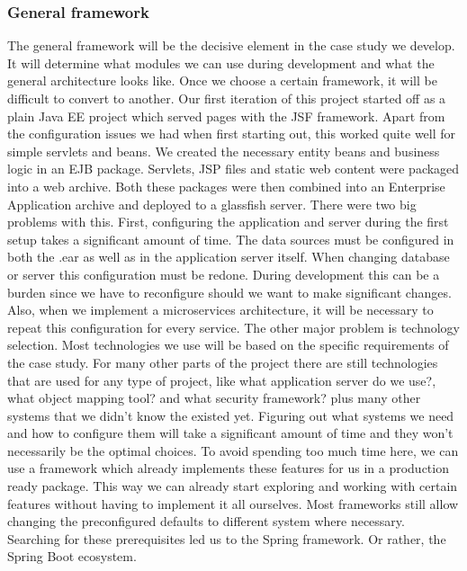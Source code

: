 \documentclass[12pt]{article}
\begin{document}
\subsubsection{General framework}
The general framework will be the decisive element in the case study we develop. It will determine what modules we can use during development and what the general architecture looks like. Once we choose a certain framework, it will be difficult to convert to another. Our first iteration of this project started off as a plain Java EE project which served pages with the JSF framework. Apart from the configuration issues we had when first starting out, this worked quite well for simple servlets and beans. We created the necessary entity beans and business logic in an EJB package. Servlets, JSP files and static web content were packaged into a web archive. Both these packages were then combined into an Enterprise Application archive and deployed to a glassfish server. There were two big problems with this. First, configuring the application and server during the first setup takes a significant amount of time. The data sources must be configured in both the .ear as well as in the application server itself. When changing database or server this configuration must be redone. During development this can be a burden since we have to reconfigure should we want to make significant changes. Also, when we implement a microservices architecture, it will be necessary to repeat this configuration for every service. The other major problem is technology selection. Most technologies we use will be based on the specific requirements of the case study. For many other parts of the project there are still technologies that are used for any type of project, like what application server do we use?, what object mapping tool? and what security framework? plus many other systems that we didn't know the existed yet. Figuring out what systems we need and how to configure them will take a significant amount of time and they won't necessarily be the optimal choices. To avoid spending too much time here, we can use a framework which already implements these features for us in a production ready package. This way we can already start exploring and working with certain features without having to implement it all ourselves. Most frameworks still allow changing the preconfigured defaults to different system where necessary. Searching for these prerequisites led us to the Spring framework. Or rather, the Spring Boot ecosystem. 
\\\\
\end{document}
